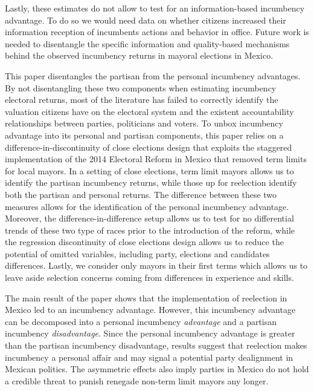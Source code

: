 \documentclass[12pt]{amsart}
\makeatletter
\def\section{\@startsection{section}{1}
	\z@{1.0\linespacing\@plus\linespacing}{.5\linespacing}{\Large}}
\numberwithin{equation}{section}
\theoremstyle{definition}
\theoremstyle{definition}
\theoremstyle{definition}
\makeatother
\begin{document}
Lastly, these estimates do not allow to test for an information-based incumbency advantage. To do so we would need data on whether citizens increased their information reception of incumbents actions and behavior in office. Future work is needed to disentangle the specific information and quality-based mechanisms behind the observed incumbency returns in mayoral elections in Mexico. 

  

\section{Conclusion} 

This paper disentangles the partisan from the personal incumbency advantages. By not disentangling these two components when estimating incumbency electoral returns, most of the literature has failed to correctly identify the valuation citizens have on the electoral system and the existent accountability relationships between parties, politicians and voters. To unbox incumbency advantage into its personal and partisan components, this paper relies on a difference-in-discontinuity of close elections design that exploits the staggered implementation of the 2014 Electoral Reform in Mexico that removed term limits for local mayors. In a setting of close elections, term limit mayors allows us to identify the partisan incumbency returns, while those up for reelection identify both the partisan and personal returns. The difference between these two measures allows for the identification of the personal incumbency advantage. Moreover, the difference-in-difference setup allows us to test for no differential trends of these two type of races prior to the introduction of the reform, while the regression discontinuity of close elections design allows us to reduce the potential of omitted variables, including party, elections and candidates differences. Lastly, we consider only mayors in their first terms which allows us to leave aside selection concerns coming from differences in experience and skills. 

The main result of the paper shows that the implementation of reelection in Mexico led to an incumbency advantage. However, this incumbency advantage can be decomposed into a personal incumbency \emph{advantage} and a partisan incumbency  \emph{disadvantage}. Since the personal incumbency advantage is greater than the partisan incumbency disadvantage, results suggest that reelection makes incumbency a personal affair and may signal a potential party dealignment in Mexican politics. The asymmetric effects also imply parties in Mexico do not hold a credible threat to punish renegade non-term limit mayors any longer. 
\end{document}
